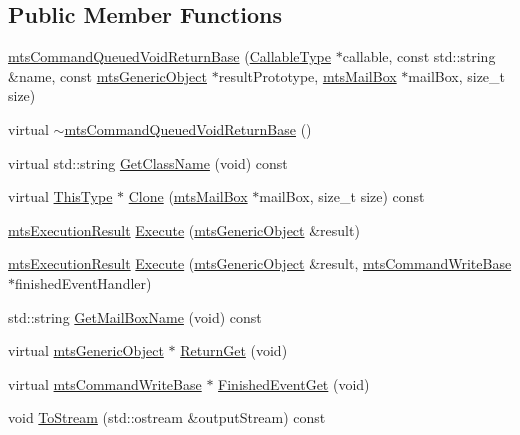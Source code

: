 \subsection*{Public Member Functions}
\begin{DoxyCompactItemize}
\item 
\hyperlink{classmts_command_queued_void_return_base_a9bbf129db24fd5d75684bc14d81535e6}{mts\-Command\-Queued\-Void\-Return\-Base} (\hyperlink{classmts_command_queued_void_return_base_a66e6a106a0c17625d9f0ec9a33ff634a}{Callable\-Type} $\ast$callable, const std\-::string \&name, const \hyperlink{classmts_generic_object}{mts\-Generic\-Object} $\ast$result\-Prototype, \hyperlink{classmts_mail_box}{mts\-Mail\-Box} $\ast$mail\-Box, size\-\_\-t size)
\item 
virtual \hyperlink{classmts_command_queued_void_return_base_ad2a3070b78c5bac00e8d6d7c798944f3}{$\sim$mts\-Command\-Queued\-Void\-Return\-Base} ()
\item 
virtual std\-::string \hyperlink{classmts_command_queued_void_return_base_acfdaaf157d65cf3b30a97fcfa6c01950}{Get\-Class\-Name} (void) const 
\item 
virtual \hyperlink{classmts_command_queued_void_return_base_a336bb46e1c968dc3003f9dc163c9f82c}{This\-Type} $\ast$ \hyperlink{classmts_command_queued_void_return_base_a21cc45ebaff3f83c0c39d264467dff4f}{Clone} (\hyperlink{classmts_mail_box}{mts\-Mail\-Box} $\ast$mail\-Box, size\-\_\-t size) const 
\item 
\hyperlink{classmts_execution_result}{mts\-Execution\-Result} \hyperlink{classmts_command_queued_void_return_base_a3a98e0b06cb0e7793d1ebccaad83bec9}{Execute} (\hyperlink{classmts_generic_object}{mts\-Generic\-Object} \&result)
\item 
\hyperlink{classmts_execution_result}{mts\-Execution\-Result} \hyperlink{classmts_command_queued_void_return_base_aceea05da6017b3b8fd3d6b1b7d34dd8e}{Execute} (\hyperlink{classmts_generic_object}{mts\-Generic\-Object} \&result, \hyperlink{classmts_command_write_base}{mts\-Command\-Write\-Base} $\ast$finished\-Event\-Handler)
\item 
std\-::string \hyperlink{classmts_command_queued_void_return_base_a599785ddb2248dc937215a3c6579df68}{Get\-Mail\-Box\-Name} (void) const 
\item 
virtual \hyperlink{classmts_generic_object}{mts\-Generic\-Object} $\ast$ \hyperlink{classmts_command_queued_void_return_base_ae92644324ed045effc08e0b6b2318660}{Return\-Get} (void)
\item 
virtual \hyperlink{classmts_command_write_base}{mts\-Command\-Write\-Base} $\ast$ \hyperlink{classmts_command_queued_void_return_base_abf2ce97d829469ae426a23f164a8364e}{Finished\-Event\-Get} (void)
\item 
void \hyperlink{classmts_command_queued_void_return_base_a7b6e745feb4966a04279f2a2ab12d481}{To\-Stream} (std\-::ostream \&output\-Stream) const 
\end{DoxyCompactItemize}
